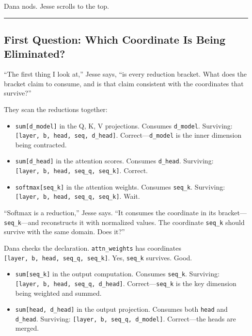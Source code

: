 \documentclass[11pt,]{article}
\providecommand{\tightlist}{%
  \setlength{\itemsep}{0pt}\setlength{\parskip}{0pt}}
\begin{document}
Dana nods. Jesse scrolls to the top.

\begin{center}\rule{0.5\linewidth}{0.4pt}\end{center}

\hypertarget{first-question-which-coordinate-is-being-eliminated}{%
\subsection{First Question: Which Coordinate Is Being
Eliminated?}\label{first-question-which-coordinate-is-being-eliminated}}

``The first thing I look at,'' Jesse says, ``is every reduction bracket.
What does the bracket claim to consume, and is that claim consistent
with the coordinates that survive?''

They scan the reductions together:

\begin{itemize}
\tightlist
\item
  \texttt{sum{[}d\_model{]}} in the Q, K, V projections. Consumes
  \texttt{d\_model}. Surviving:
  \texttt{{[}layer,\ b,\ head,\ seq,\ d\_head{]}}.
  Correct---\texttt{d\_model} is the inner dimension being contracted.
\item
  \texttt{sum{[}d\_head{]}} in the attention scores. Consumes
  \texttt{d\_head}. Surviving:
  \texttt{{[}layer,\ b,\ head,\ seq\_q,\ seq\_k{]}}. Correct.
\item
  \texttt{softmax{[}seq\_k{]}} in the attention weights. Consumes
  \texttt{seq\_k}. Surviving:
  \texttt{{[}layer,\ b,\ head,\ seq\_q,\ seq\_k{]}}. Wait.
\end{itemize}

``Softmax is a reduction,'' Jesse says. ``It consumes the coordinate in
its bracket---\texttt{seq\_k}---and reconstructs it with normalized
values. The coordinate \texttt{seq\_k} should survive with the same
domain. Does it?''

Dana checks the declaration. \texttt{attn\_weights} has coordinates
\texttt{{[}layer,\ b,\ head,\ seq\_q,\ seq\_k{]}}. Yes, \texttt{seq\_k}
survives. Good.

\begin{itemize}
\tightlist
\item
  \texttt{sum{[}seq\_k{]}} in the output computation. Consumes
  \texttt{seq\_k}. Surviving:
  \texttt{{[}layer,\ b,\ head,\ seq\_q,\ d\_head{]}}.
  Correct---\texttt{seq\_k} is the key dimension being weighted and
  summed.
\item
  \texttt{sum{[}head,\ d\_head{]}} in the output projection. Consumes
  both \texttt{head} and \texttt{d\_head}. Surviving:
  \texttt{{[}layer,\ b,\ seq\_q,\ d\_model{]}}. Correct---the heads are
  merged.
\end{itemize}
\end{document}
